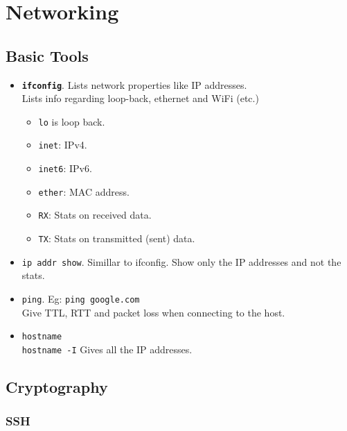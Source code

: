 \section{Networking}

\subsection{Basic Tools}

\begin{itemize}
\item \textbf{\texttt{ifconfig}}. Lists network properties like IP addresses.\\
        Lists info regarding loop-back, ethernet and WiFi (etc.)\\
        \begin{itemize}
        \item \texttt{lo} is loop back.\\
        \item \texttt{inet}: IPv4.\\
        \item \texttt{inet6}: IPv6.\\
        \item \texttt{ether}: MAC address.\\
        \item \texttt{RX}: Stats on received data.\\
        \item \texttt{TX}: Stats on transmitted (sent) data.\\
        \end{itemize}
\item \texttt{ip addr show}. Simillar to ifconfig. Show only the IP addresses and not the stats.
\item \texttt{ping}. Eg: \texttt{ping google.com}\\
        Give TTL, RTT and packet loss when connecting to the host.\\
\item \texttt{hostname}\\
        \texttt{hostname -I} Gives all the IP addresses.\\
\end{itemize}


\subsection{Cryptography}

\subsubsection{SSH}

